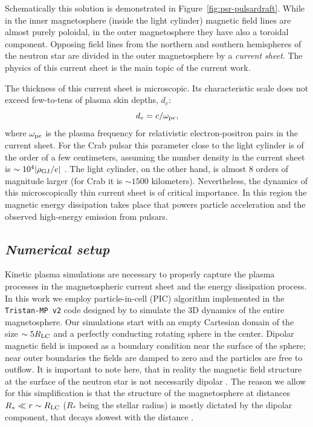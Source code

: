 Schematically this solution is demonstrated in Figure~\ref{fig:psr-pulsardraft}. While in the inner magnetosphere (inside the light cylinder) magnetic field lines are almost purely poloidal, in the outer magnetosphere they have also a toroidal component. Opposing field lines from the northern and southern hemispheres of the neutron star are divided in the outer magnetosphere by a \emph{current sheet}. The physics of this current sheet is the main topic of the current work. 

The thickness of this current sheet is microscopic. Its characteristic scale does not exceed few-to-tens of plasma skin depths, $d_e$:
\begin{equation}
    d_e = c/\omega_{{\rm p}e},
\end{equation}
\noindent where $\omega_{{\rm p}e}$ is the plasma frequency for relativistic electron-positron pairs in the current sheet. For the Crab pulsar this parameter close to the light cylinder is of the order of a few centimeters, assuming the number density in the current sheet is $\sim 10^4|\rho_{\rm GJ}/e|$ \citep{1996A&A...311..172L}. The light cylinder, on the other hand, is almost $8$ orders of magnitude larger (for Crab it is $\sim 1500$ kilometers). Nevertheless, the dynamics of this microscopically thin current sheet is of critical importance. In this region the magnetic energy dissipation takes place that powers particle acceleration and the observed high-energy emission from pulsars.

\subsection*{\small\it Numerical setup}

Kinetic plasma simulations are necessary to properly capture the plasma processes in the magnetospheric current sheet and the energy dissipation process. In this work we employ particle-in-cell (PIC) algorithm implemented in the \texttt{Tristan-MP v2} code designed by \cite{tristanv2} to simulate the 3D dynamics of the entire magnetosphere. Our simulations start with an empty Cartesian domain of the size $\sim 5 R_{\rm LC}$ and a perfectly conducting rotating sphere in the center. Dipolar magnetic field is imposed as a boundary condition near the surface of the sphere; near outer boundaries the fields are damped to zero and the particles are free to outflow. It is important to note here, that in reality the magnetic field structure at the surface of the neutron star is not necessarily dipolar \citep{2019ApJ...887L..23B}. The reason we allow for this simplification is that the structure of the magnetosphere at distances $R_*\ll r\sim R_{\rm LC}$ ($R_*$ being the stellar radius) is mostly dictated by the dipolar component, that decays slowest with the distance \citep{2020ApJ...893L..38C}. 

